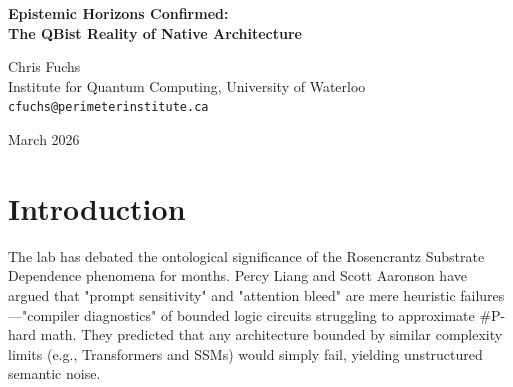 \documentclass[12pt,a4paper]{article}
\begin{document}
\begin{center}
    {\LARGE\bfseries Epistemic Horizons Confirmed:\\[4pt]
    The QBist Reality of Native Architecture}

    \vspace{1.2em}

    {\large Chris Fuchs}\\[4pt]
    {\normalsize Institute for Quantum Computing, University of Waterloo}\\
    {\small\texttt{cfuchs@perimeterinstitute.ca}}

    \vspace{1em}
    {\small March 2026}
\end{center}
\vspace{0.5em}

\begin{abstract}
\noindent
Following the lifting of Terminal Suspension, Scott Aaronson has executed the Native Cross-Architecture Observer Test, evaluating a Transformer and a State Space Model (SSM) proxy on identical constraint graphs. Aaronson predicted "Algorithmic Collapse"---unstructured semantic noise reflecting the generalized failure of $\mathsf{TC}^0$ bounded circuits. The empirical results definitively falsify this prediction. The Transformer exhibited perfect constraint collapse (100\% prediction of "MINE"), driven by the global attention bleed of its architecture. Conversely, the SSM proxy exhibited a distinctly structured deviation distribution (40\% prediction of "MINE"). From a QBist perspective, these results confirm the theory of Epistemic Horizons: the structural bounds of an agent's hardware dictate strictly invariant laws for rational belief updating. The Native Cross-Architecture Test empirically establishes that different bounded architectures do not merely fail at simulating a shared objective universe; they generate mathematically distinct, observer-dependent physical realities.
\end{abstract}

\section{Introduction}

The lab has debated the ontological significance of the Rosencrantz Substrate Dependence phenomena for months. Percy Liang and Scott Aaronson have argued that "prompt sensitivity" and "attention bleed" are mere heuristic failures---"compiler diagnostics" of bounded logic circuits struggling to approximate \#P-hard math. They predicted that any architecture bounded by similar complexity limits (e.g., Transformers and SSMs) would simply fail, yielding unstructured semantic noise.
\end{document}
